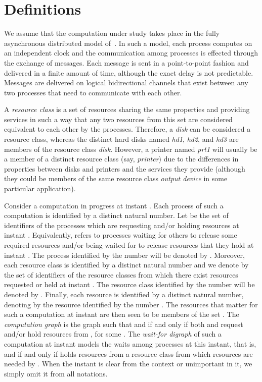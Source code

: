 \documentclass{article}
\begin{document}
\section{Definitions}

We assume that the computation under study takes place in the fully asynchronous
distributed model of~\cite{LivroValmir}. In such a model, each process computes
on an independent clock and the communication among processes is effected
through the exchange of messages. Each message is sent in a point-to-point
fashion and delivered in a finite amount of time, although the exact delay is
not predictable. Messages are delivered on logical bidirectional channels that
exist between any two processes that need to communicate with each other.

A \emph{resource class} is a set of resources sharing the same properties and
providing services in such a way that any two resources from this set are
considered equivalent to each other by the processes. Therefore, a \emph{disk}
can be considered a resource class, whereas the distinct hard disks named
\emph{hd1}, \emph{hd2}, and \emph{hd3} are members of the resource class
\emph{disk}. However, a printer named \emph{prt1} will usually be a member of a
distinct resource class (say, \emph{printer}) due to the differences in
properties between disks and printers and the services they provide (although
they could be members of the same resource class \emph{output device} in some
particular application). 

Consider a computation in progress at instant . Each process of
such a computation is identified by a distinct natural number. Let
 be the set of identifiers of the processes which
are requesting and/or holding resources at instant . Equivalently,
 refers to processes waiting for others to release some required
resources and/or being waited for to release resources that they hold at instant
. The process identified by the number  will be denoted
by . Moreover, each resource class is identified by a distinct natural
number and we denote by  the set of identifiers of the
resource classes from which there exist resources requested or held at instant
. The resource class identified by the number  will be denoted by
. Finally, each resource is identified by a distinct natural number,
denoting by  the resource identified by the number . The
resources that matter for such a computation at instant  are then seen to be
members of the set . The \emph{computation graph}
 is the graph such that  and  if and
only if both  and  request and/or hold resources from , for
some . The \emph{wait-for digraph}  of such a computation at
instant  models the waits among processes at this instant, that is,
 and  if and only if  holds
resources from a resource class from which resources are needed by . When
the instant  is clear from the context or unimportant in it, we simply omit
it from all notations. 
\end{document}
